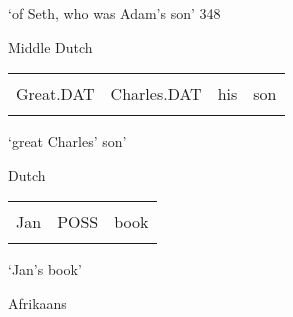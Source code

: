 \begin{styleTranslation}
‘of Seth, who was Adam’s son’ 348

\end{styleTranslation}

\begin{listWWNumileveli}
\item 

\begin{styleExample}
Middle Dutch

\end{styleExample}

\end{listWWNumileveli}

\begin{tabular}{llll}
\lsptoprule
\multicolumn{4}{l}{Grote

}\\
Great.DAT & Charles.DAT & his & son\\
\lspbottomrule
\end{tabular}

\begin{styleTranslation}
‘great Charles’ son’

\end{styleTranslation}

\begin{listWWNumileveli}
\item 

\begin{styleExample}
Dutch

\end{styleExample}

\end{listWWNumileveli}

\begin{tabular}{lll}
\lsptoprule
\multicolumn{3}{l}{Jan

}\\
Jan & POSS & book\\
\lspbottomrule
\end{tabular}

\begin{styleTranslation}
‘Jan’s book’

\end{styleTranslation}

\begin{listWWNumileveli}
\item 

\begin{styleExample}
\label{bkm:Ref151373831}Afrikaans 

\end{styleExample}

\end{listWWNumileveli}

